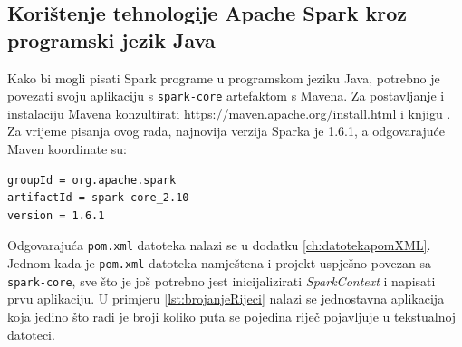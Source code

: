 \documentclass[times, utf8, zavrsni, numeric]{fer}
\begin{document}
\subsection{Korištenje tehnologije Apache Spark kroz programski jezik Java}
Kako bi mogli pisati Spark programe u programskom jeziku Java, potrebno je povezati svoju aplikaciju s \texttt{spark-core} artefaktom s Mavena. Za postavljanje i instalaciju Mavena konzultirati \url{https://maven.apache.org/install.html} i knjigu \cite{marcupic}. Za vrijeme pisanja ovog rada, najnovija verzija Sparka je 1.6.1, a odgovarajuće Maven koordinate su:
\begin{lstlisting}[language=bash, basicstyle=\small]
groupId = org.apache.spark
artifactId = spark-core_2.10
version = 1.6.1
\end{lstlisting}

Odgovarajuća \texttt{pom.xml} datoteka nalazi se u dodatku \ref{ch:datotekapomXML}.
Jednom kada je \texttt{pom.xml} datoteka namještena i projekt uspješno povezan sa \texttt{spark-core}, sve što je još potrebno jest inicijalizirati \emph{SparkContext} i napisati prvu aplikaciju. U primjeru \ref{lst:brojanjeRijeci} nalazi se jednostavna aplikacija koja jedino što radi je broji koliko puta se pojedina riječ pojavljuje u tekstualnoj datoteci.
\end{document}
